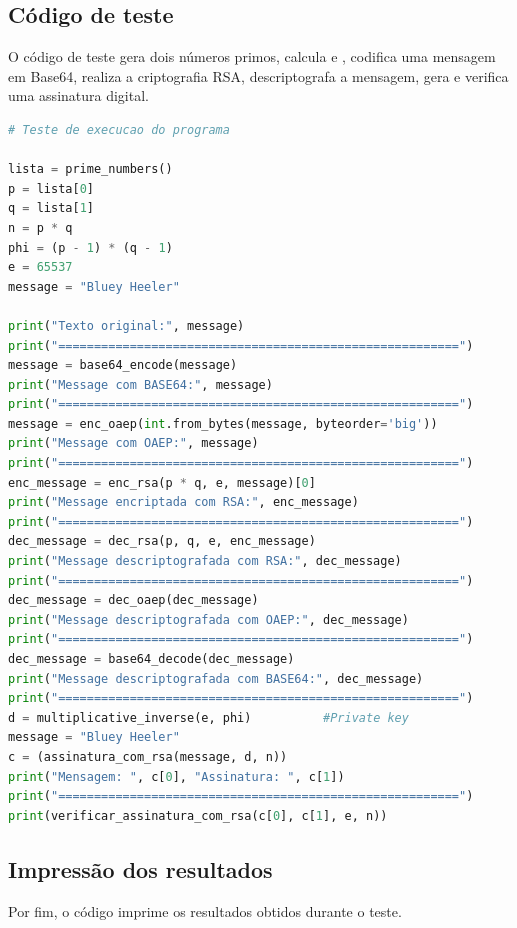 \documentclass{article}
\begin{document}
\subsection{Código de teste}
O código de teste gera dois números primos, calcula  e , codifica uma mensagem em Base64, realiza a criptografia RSA, descriptografa a mensagem, gera e verifica uma assinatura digital.
\begin{lstlisting}[language=Python]
    # Teste de execucao do programa

lista = prime_numbers()
p = lista[0]
q = lista[1]
n = p * q
phi = (p - 1) * (q - 1)
e = 65537
message = "Bluey Heeler"

print("Texto original:", message)
print("========================================================")
message = base64_encode(message)
print("Message com BASE64:", message)
print("========================================================")
message = enc_oaep(int.from_bytes(message, byteorder='big'))
print("Message com OAEP:", message)
print("========================================================")
enc_message = enc_rsa(p * q, e, message)[0]
print("Message encriptada com RSA:", enc_message)
print("========================================================")
dec_message = dec_rsa(p, q, e, enc_message)
print("Message descriptografada com RSA:", dec_message)
print("========================================================")
dec_message = dec_oaep(dec_message)
print("Message descriptografada com OAEP:", dec_message)
print("========================================================")
dec_message = base64_decode(dec_message)
print("Message descriptografada com BASE64:", dec_message)
print("========================================================")
d = multiplicative_inverse(e, phi)          #Private key
message = "Bluey Heeler"                    
c = (assinatura_com_rsa(message, d, n))
print("Mensagem: ", c[0], "Assinatura: ", c[1])
print("========================================================")
print(verificar_assinatura_com_rsa(c[0], c[1], e, n))
\end{lstlisting}

\subsection{Impressão dos resultados}
Por fim, o código imprime os resultados obtidos durante o teste.

\vspace{4 cm}
\end{document}
